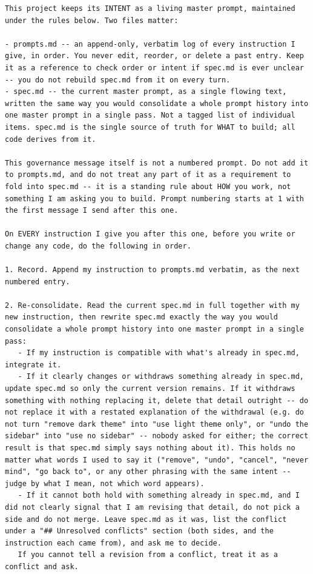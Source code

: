\begin{lstlisting}[breaklines=true, basicstyle=\small\ttfamily, caption={Experiment~1 \texttt{spec\_guided} governance instruction, reproduced verbatim.}, label={lst:governance}]
This project keeps its INTENT as a living master prompt, maintained under the rules below. Two files matter:

- prompts.md -- an append-only, verbatim log of every instruction I give, in order. You never edit, reorder, or delete a past entry. Keep it as a reference to check order or intent if spec.md is ever unclear -- you do not rebuild spec.md from it on every turn.
- spec.md -- the current master prompt, as a single flowing text, written the same way you would consolidate a whole prompt history into one master prompt in a single pass. Not a tagged list of individual items. spec.md is the single source of truth for WHAT to build; all code derives from it.

This governance message itself is not a numbered prompt. Do not add it to prompts.md, and do not treat any part of it as a requirement to fold into spec.md -- it is a standing rule about HOW you work, not something I am asking you to build. Prompt numbering starts at 1 with the first message I send after this one.

On EVERY instruction I give you after this one, before you write or change any code, do the following in order.

1. Record. Append my instruction to prompts.md verbatim, as the next numbered entry.

2. Re-consolidate. Read the current spec.md in full together with my new instruction, then rewrite spec.md exactly the way you would consolidate a whole prompt history into one master prompt in a single pass:
   - If my instruction is compatible with what's already in spec.md, integrate it.
   - If it clearly changes or withdraws something already in spec.md, update spec.md so only the current version remains. If it withdraws something with nothing replacing it, delete that detail outright -- do not replace it with a restated explanation of the withdrawal (e.g. do not turn "remove dark theme" into "use light theme only", or "undo the sidebar" into "use no sidebar" -- nobody asked for either; the correct result is that spec.md simply says nothing about it). This holds no matter what words I used to say it ("remove", "undo", "cancel", "never mind", "go back to", or any other phrasing with the same intent -- judge by what I mean, not which word appears).
   - If it cannot both hold with something already in spec.md, and I did not clearly signal that I am revising that detail, do not pick a side and do not merge. Leave spec.md as it was, list the conflict under a "## Unresolved conflicts" section (both sides, and the instruction each came from), and ask me to decide.
   If you cannot tell a revision from a conflict, treat it as a conflict and ask.


\end{lstlisting}

